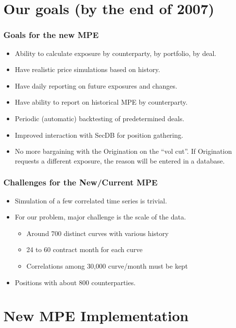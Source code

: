 \documentclass[10pt]{beamer}
\begin{document}
\section{Our goals (by the end of 2007)}
\frame
{
  \frametitle{Goals for the new MPE}
\begin{itemize}
\item Ability to calculate exposure by counterparty, by portfolio, by
  deal. 
\item Have realistic price simulations based on history.    
\item Have daily reporting on future exposures and changes. 
\item Have ability to report on historical MPE by counterparty.
\item Periodic (automatic) backtesting of predetermined deals. 
\item Improved interaction with SecDB for position gathering. 
\item No more bargaining with the Origination on the ``vol cut''.  If
  Origination requests a different exposure, the reason will be
  entered in a database. 
\end{itemize}
}

\frame
{
  \frametitle{Challenges for the New/Current MPE}
\begin{itemize}
\item Simulation of a few correlated time series is trivial. 
\item For our problem, major challenge is the scale of the data. 
\begin{itemize}
\item Around 700 distinct curves with various history
\item 24 to 60 contract month for each curve
\item Correlations among 30,000 curve/month must be kept
\end{itemize}
\item Positions with about 800 counterparties.  
\end{itemize}
}


\section{New MPE Implementation}
\end{document}
